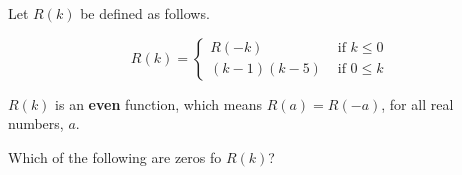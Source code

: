 \documentclass{ximera}
\author{Lee Wayand}
\begin{document}
\begin{exercise}




Let $R(k)$ be defined as follows.

\[
R(k) = 
\begin{cases}
  R(-k) & \text{ if }  k \le 0 \\
  (k-1)(k-5) & \text{ if } 0 \leq k 
\end{cases}
\]

$R(k)$ is an \textbf{even} function, which means $R(a) = R(-a)$, for all real numbers, $a$. \\


\begin{question}



Which of the following are zeros fo $R(k)$?


\begin{selectAll}
\end{selectAll}

\end{question}


\end{exercise}
\end{document}
